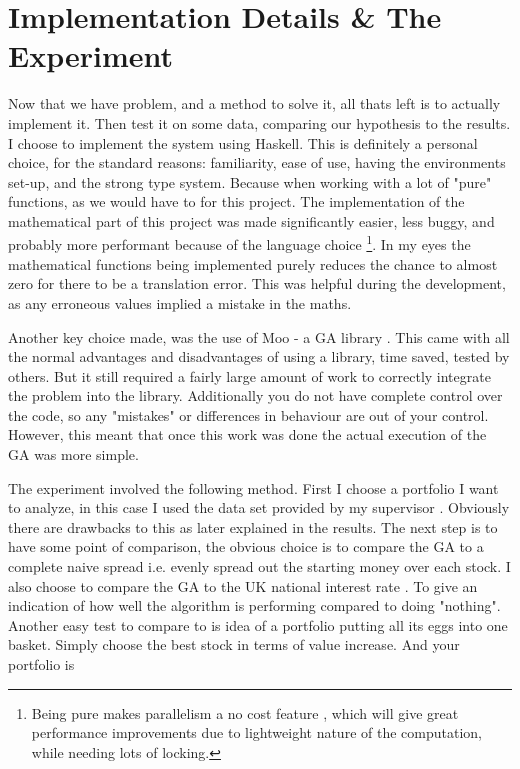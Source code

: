 \documentclass[11pt]{article}
\begin{document}
\section{Implementation Details \& The Experiment}

    Now that we have problem, and a method to solve it, all thats left is to actually
    implement it. Then test it on some data, comparing our hypothesis to the results.
    I choose to implement the system using Haskell. This is definitely a personal
    choice, for the standard reasons: familiarity, ease of use, having the environments
    set-up, and the strong type system. Because when working with a lot of "pure"
    functions, as we would have to for this project. The implementation 
    of the mathematical part of this project was made significantly
    easier, less buggy, and probably more performant because of the language choice
    \footnote{Being pure makes parallelism a no cost feature \cite{HarrisMarlowJones, Chakravarty},
    which will give great performance improvements due to lightweight nature of the 
    computation, while needing lots of locking. }.
    In my eyes the mathematical functions
    being implemented purely reduces the chance to almost zero for there to be a translation
    error. This was helpful during the development, as any erroneous values implied a mistake
    in the maths.

    Another key choice made, was the use of Moo - a GA library \cite{Moo}. This came with all
    the normal advantages and disadvantages of using a library, time saved, tested by others.
    But it still required a fairly large amount of work to correctly integrate the
    problem into the library. Additionally you do not have complete control over the code,
    so any "mistakes" or differences in behaviour are out of your control. However,
    this meant that once this work was done the actual execution of the GA was more simple.

    The experiment involved the following method. First I choose a portfolio I want to
    analyze, in this case I used the data set provided by my supervisor \cite{Dataset}.
    Obviously there are drawbacks to this as later explained in the results. The next step is
    to have some point of comparison, the obvious choice is to compare the GA to
    a complete naive spread i.e. evenly spread out the starting money over each stock.
    I also choose to compare the GA to the UK national interest rate \cite{BankOfE} . To give an
    indication of how well the algorithm is performing compared to doing "nothing". Another
    easy test to compare to is idea of a portfolio putting all its eggs into one basket.
    Simply choose the best stock in terms of value increase. And your portfolio is
    
\end{document}
